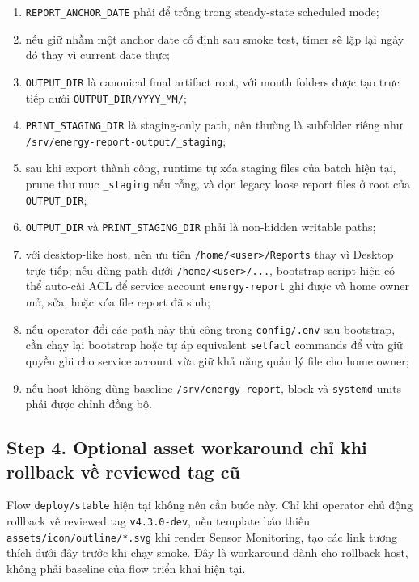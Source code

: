 \begin{enumerate}[label=-]
\item \texttt{REPORT\_ANCHOR\_DATE} phải để trống trong steady-state scheduled mode;
\item nếu giữ nhầm một anchor date cố định sau smoke test, timer sẽ lặp lại ngày đó thay vì current date thực;
\item \texttt{OUTPUT\_DIR} là canonical final artifact root, với month folders được tạo trực tiếp dưới \texttt{OUTPUT\_DIR/YYYY\_MM/};
\item \texttt{PRINT\_STAGING\_DIR} là staging-only path, nên thường là subfolder riêng như \texttt{/srv/energy-report-output/\_staging};
\item sau khi export thành công, runtime tự xóa staging files của batch hiện tại, prune thư mục \texttt{\_staging} nếu rỗng, và dọn legacy loose report files ở root của \texttt{OUTPUT\_DIR};
\item \texttt{OUTPUT\_DIR} và \texttt{PRINT\_STAGING\_DIR} phải là non-hidden writable paths;
\item với desktop-like host, nên ưu tiên \texttt{/home/<user>/Reports} thay vì Desktop trực tiếp; nếu dùng path dưới \texttt{/home/<user>/...}, bootstrap script hiện có thể auto-cài ACL để service account \texttt{energy-report} ghi được và home owner mở, sửa, hoặc xóa file report đã sinh;
\item nếu operator đổi các path này thủ công trong \texttt{config/.env} sau bootstrap, cần chạy lại bootstrap hoặc tự áp equivalent \texttt{setfacl} commands để vừa giữ quyền ghi cho service account vừa giữ khả năng quản lý file cho home owner;
\item nếu host không dùng baseline \texttt{/srv/energy-report}, block và \texttt{systemd} units phải được chỉnh đồng bộ.
\end{enumerate}

\subsection{Step 4. Optional asset workaround chỉ khi rollback về reviewed tag cũ}

Flow \texttt{deploy/stable} hiện tại không nên cần bước này. Chỉ khi operator chủ động rollback về reviewed tag \texttt{v4.3.0-dev}, nếu template báo thiếu \texttt{assets/icon/outline/*.svg} khi render Sensor Monitoring, tạo các link tương thích dưới đây trước khi chạy smoke. Đây là workaround dành cho rollback host, không phải baseline của flow triển khai hiện tại.

